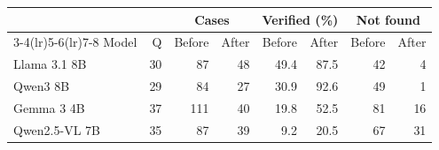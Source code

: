 \begin{tabular}{lrrrrrrr}
\toprule
& & \multicolumn{2}{c}{Cases} & \multicolumn{2}{c}{Verified (\%)} & \multicolumn{2}{c}{Not found} \\
\cmidrule(lr){3-4}\cmidrule(lr){5-6}\cmidrule(lr){7-8}
Model & Q & Before & After & Before & After & Before & After \\
\midrule
Llama 3.1 8B & 30 & 87 & 48 & 49.4 & 87.5 & 42 & 4 \\
Qwen3 8B & 29 & 84 & 27 & 30.9 & 92.6 & 49 & 1 \\
Gemma 3 4B & 37 & 111 & 40 & 19.8 & 52.5 & 81 & 16 \\
Qwen2.5-VL 7B & 35 & 87 & 39 & 9.2 & 20.5 & 67 & 31 \\
\bottomrule
\end{tabular}
